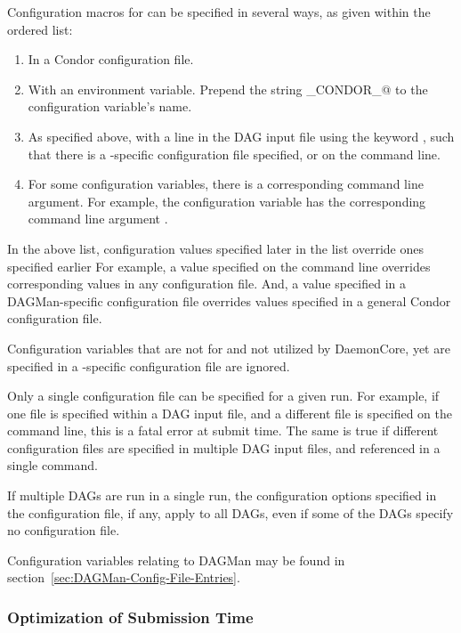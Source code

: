 Configuration macros for  can be specified in several
ways, as given within the ordered list:
\begin{enumerate}
\item
In a Condor configuration file.
\item
With an environment variable.
Prepend the string \verb@_CONDOR_@ to the configuration variable's name.
\item
As specified above, with a line in the DAG input file
using the keyword , such that there is a -specific
configuration file specified,
or on the  command line.
\item
For some configuration variables,
there is a corresponding  command line argument.
For example, the configuration variable 
has the corresponding command line argument .
\end{enumerate}

In the above list, configuration values specified later in the list
override ones specified earlier
For example, a value specified on the
 command line overrides corresponding values in any
configuration file.
And, a value specified in a DAGMan-specific configuration
file overrides values specified in a general Condor configuration file.

Configuration variables that are not for 
and not utilized by DaemonCore, yet are specified in a
-specific configuration file are ignored.

Only a single configuration file can be specified for a given
 run.  For example, if one file is specified within a DAG
input file,
and a different file is specified on the  command
line, this is a fatal error at submit time.
The same is true if
different configuration files are specified in multiple DAG input files,
and referenced in a single  command.

If multiple DAGs are run in a single  run, the
configuration options specified in the  configuration
file, if any, apply to all DAGs, even if some of the DAGs specify no
configuration file.

Configuration variables relating to DAGMan may be found
in section~\ref{sec:DAGMan-Config-File-Entries}.

\subsubsection{\label{sec:MultipleDAGs}Optimization of Submission Time}

